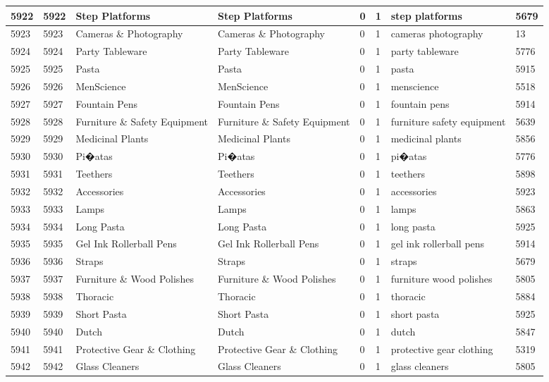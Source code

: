 \begin{longtable}{|l|l|l|l|l|l|l|l|}
5922 & 5922 & Step Platforms & Step Platforms & 0 & 1 & step platforms & 5679 \\ \hline 
5923 & 5923 & Cameras \& Photography & Cameras \& Photography & 0 & 1 & cameras photography & 13 \\ \hline 
5924 & 5924 & Party Tableware & Party Tableware & 0 & 1 & party tableware & 5776 \\ \hline 
5925 & 5925 & Pasta & Pasta & 0 & 1 & pasta & 5915 \\ \hline 
5926 & 5926 & MenScience & MenScience & 0 & 1 & menscience & 5518 \\ \hline 
5927 & 5927 & Fountain Pens & Fountain Pens & 0 & 1 & fountain pens & 5914 \\ \hline 
5928 & 5928 & Furniture \& Safety Equipment & Furniture \& Safety Equipment & 0 & 1 & furniture safety equipment & 5639 \\ \hline 
5929 & 5929 & Medicinal Plants & Medicinal Plants & 0 & 1 & medicinal plants & 5856 \\ \hline 
5930 & 5930 & Pi�atas & Pi�atas & 0 & 1 & pi�atas & 5776 \\ \hline 
5931 & 5931 & Teethers & Teethers & 0 & 1 & teethers & 5898 \\ \hline 
5932 & 5932 & Accessories & Accessories & 0 & 1 & accessories & 5923 \\ \hline 
5933 & 5933 & Lamps & Lamps & 0 & 1 & lamps & 5863 \\ \hline 
5934 & 5934 & Long Pasta & Long Pasta & 0 & 1 & long pasta & 5925 \\ \hline 
5935 & 5935 & Gel Ink Rollerball Pens & Gel Ink Rollerball Pens & 0 & 1 & gel ink rollerball pens & 5914 \\ \hline 
5936 & 5936 & Straps & Straps & 0 & 1 & straps & 5679 \\ \hline 
5937 & 5937 & Furniture \& Wood Polishes & Furniture \& Wood Polishes & 0 & 1 & furniture wood polishes & 5805 \\ \hline 
5938 & 5938 & Thoracic & Thoracic & 0 & 1 & thoracic & 5884 \\ \hline 
5939 & 5939 & Short Pasta & Short Pasta & 0 & 1 & short pasta & 5925 \\ \hline 
5940 & 5940 & Dutch & Dutch & 0 & 1 & dutch & 5847 \\ \hline 
5941 & 5941 & Protective Gear \& Clothing & Protective Gear \& Clothing & 0 & 1 & protective gear clothing & 5319 \\ \hline 
5942 & 5942 & Glass Cleaners & Glass Cleaners & 0 & 1 & glass cleaners & 5805 \\ \hline 

\end{longtable}

